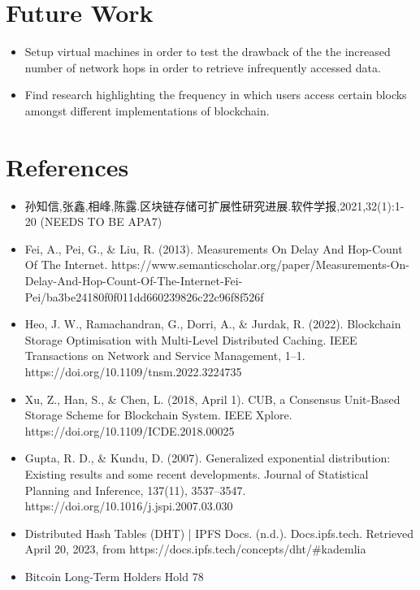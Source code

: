 \documentclass{article}
\begin{document}
\begin{CJK}{UTF8}{gbsn}
\section{Future Work}
\begin{itemize}
    \item Setup virtual machines in order to test the drawback of the the increased number of network hops in order to retrieve  infrequently accessed data.
    \item Find research highlighting the frequency in which users access certain blocks amongst different implementations of blockchain.
\end{itemize}

\section{References}
\begin{itemize}
    \item 孙知信,张鑫,相峰,陈露.区块链存储可扩展性研究进展.软件学报,2021,32(1):1-20 (NEEDS TO BE APA7)
    \item Fei, A., Pei, G., \& Liu, R. (2013). Measurements On Delay And Hop-Count Of The Internet. https://www.semanticscholar.org/paper/Measurements-On-Delay-And-Hop-Count-Of-The-Internet-Fei-Pei/ba3be24180f0f011dd660239826c22c96f8f526f
    \item Heo, J. W., Ramachandran, G., Dorri, A., \& Jurdak, R. (2022). Blockchain Storage Optimisation with Multi-Level Distributed Caching. IEEE Transactions on Network and Service Management, 1–1. https://doi.org/10.1109/tnsm.2022.3224735
    \item Xu, Z., Han, S., \& Chen, L. (2018, April 1). CUB, a Consensus Unit-Based Storage Scheme for Blockchain System. IEEE Xplore. https://doi.org/10.1109/ICDE.2018.00025
    \item Gupta, R. D., \& Kundu, D. (2007). Generalized exponential distribution: Existing results and some recent developments. Journal of Statistical Planning and Inference, 137(11), 3537–3547. https://doi.org/10.1016/j.jspi.2007.03.030
    \item Distributed Hash Tables (DHT) | IPFS Docs. (n.d.). Docs.ipfs.tech. Retrieved April 20, 2023, from https://docs.ipfs.tech/concepts/dht/\#kademlia
    \item Bitcoin Long-Term Holders Hold 78%
\end{itemize}

\end{CJK}
\end{document}
